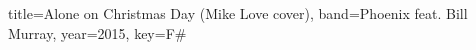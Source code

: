 \documentclass{../../tex/bekki-leadsheet}
\begin{document}
\begin{song}{title={Alone on Christmas Day (Mike Love cover)}, band={Phoenix feat. Bill Murray}, year={2015}, key={F#}}

  

\end{song}
\end{document}
